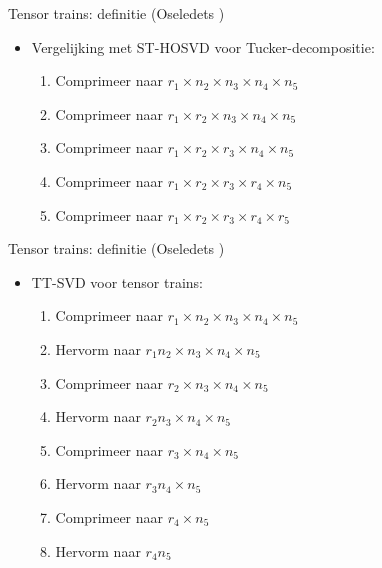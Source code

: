 \documentclass[t,12pt,dutch
\ifx\beamermode\undefined\else,\beamermode\fi
]{beamer}
\begin{document}
\begin{frame}{Tensor trains: definitie (Oseledets \cite{ref:tensor_trains})}

\begin{itemize}
\item Vergelijking met ST-HOSVD voor Tucker-decompositie:
\begin{enumerate}
\item Comprimeer naar $r_1 \times n_2 \times n_3 \times n_4 \times n_5$
\item Comprimeer naar $r_1 \times r_2 \times n_3 \times n_4 \times n_5$
\item Comprimeer naar $r_1 \times r_2 \times r_3 \times n_4 \times n_5$
\item Comprimeer naar $r_1 \times r_2 \times r_3 \times r_4 \times n_5$
\item Comprimeer naar $r_1 \times r_2 \times r_3 \times r_4 \times r_5$
\end{enumerate}
\end{itemize}

\end{frame}

\begin{frame}{Tensor trains: definitie (Oseledets \cite{ref:tensor_trains})}

\begin{itemize}
\item TT-SVD voor tensor trains:
\begin{enumerate}
\item Comprimeer naar $r_1 \times n_2 \times n_3 \times n_4 \times n_5$
\item Hervorm naar $r_1 n_2 \times n_3 \times n_4 \times n_5$
\item Comprimeer naar $r_2 \times n_3 \times n_4 \times n_5$
\item Hervorm naar $r_2 n_3 \times n_4 \times n_5$
\item Comprimeer naar $r_3 \times n_4 \times n_5$
\item Hervorm naar $r_3 n_4 \times n_5$
\item Comprimeer naar $r_4 \times n_5$
\item Hervorm naar $r_4 n_5$
\end{enumerate}
\end{itemize}

\end{frame}
\end{document}
